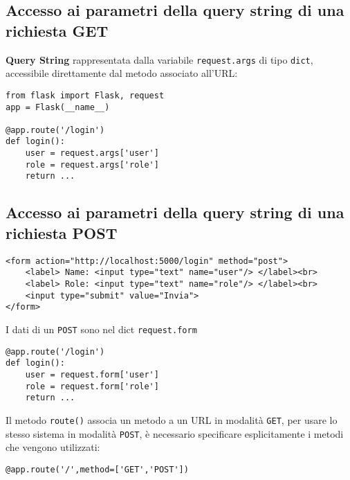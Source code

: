 \documentclass[a4paper, 10pt, titlepage]{article}
\begin{document}
		\subsection{Accesso ai parametri della query string di una richiesta GET}
		\textbf{Query String} rappresentata dalla variabile \lstinline|request.args| di tipo \lstinline|dict|, accessibile direttamente dal metodo associato all'URL:
		\begin{lstlisting}[frame=tb]
from flask import Flask, request
app = Flask(__name__)

@app.route('/login')
def login():
	user = request.args['user']
	role = request.args['role']
	return ...
		\end{lstlisting}
		\subsection{Accesso ai parametri della query string di una richiesta POST}
		\lstset{language=HTML}
		\begin{lstlisting}[frame=tb, caption={esempio di form html5}]
<form action="http://localhost:5000/login" method="post">
	<label> Name: <input type="text" name="user"/> </label><br>
	<label> Role: <input type="text" name="role"/> </label><br>
	<input type="submit" value="Invia">
</form>
		\end{lstlisting}
		\lstset{language=Python}
		I dati di un \lstinline|POST| sono nel dict \lstinline|request.form|
		\begin{lstlisting}[frame=tb]
@app.route('/login')
def login():
	user = request.form['user']
	role = request.form['role']
	return ...
		\end{lstlisting}
		Il metodo \lstinline|route()| associa un metodo a un URL in modalità \lstinline|GET|, per usare lo stesso sistema in modalità \lstinline|POST|, è necessario specificare esplicitamente i metodi che vengono utilizzati:
		\begin{lstlisting}
@app.route('/',method=['GET','POST'])
		\end{lstlisting}
		
		\newpage
		
\end{document}

